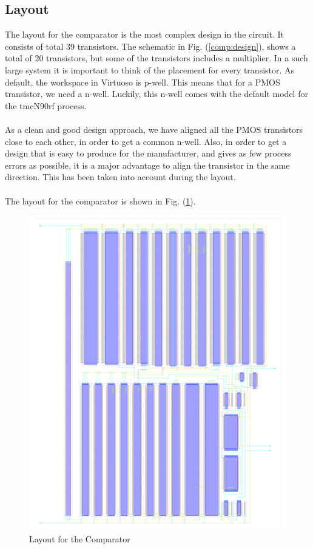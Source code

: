 \documentclass[english, 12pt, a4paper]{ifimaster}
\begin{document}
\subsection{Layout}
The layout for the comparator is the most complex design in the circuit. It consists 
of total 39 transistors. The schematic in Fig. (\ref{comp:design}), shows a total of 20 transistors, but some of the
transistors includes a multiplier. In a such large system it is important to think 
of the placement for every transistor. As default, the workspace in Virtuoso is p-well. 
This means that for a PMOS transistor, we need a n-well. Luckily, this n-well comes 
with the default model for the tmcN90rf process. \\
\\
As a clean and good design approach, we have aligned all the PMOS transistors close 
to each other, in order to get a common n-well. Also, in order to get a design that 
is easy to produce for the manufacturer, and gives as few process errors as 
possible, it is a major advantage to align the transistor in the same direction. 
This has been taken into account during the layout.\\
\\
The layout for the comparator is shown in Fig. (\ref{fig:layout:comparator}). 
\begin{figure}[!ht]
 \centering
 \includegraphics[width=\textwidth]{img/layout/comparator}
 \caption{Layout for the Comparator}
 \label{fig:layout:comparator}
\end{figure}
\end{document}
